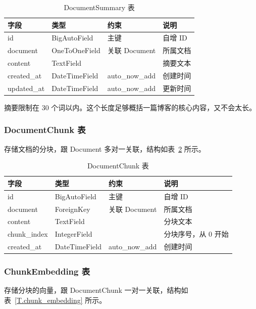 \begin{table}[htb]
  \centering
  \caption{DocumentSummary 表}
  \label{T.document_summary}
  \begin{tabular}{llll}
    \hline
    字段 & 类型 & 约束 & 说明 \\
    \hline
    id & BigAutoField & 主键 & 自增 ID \\
    document & OneToOneField & 关联 Document & 所属文档 \\
    content & TextField & & 摘要文本 \\
    created\_at & DateTimeField & auto\_now\_add & 创建时间 \\
    updated\_at & DateTimeField & auto\_now\_add & 更新时间 \\
    \hline
  \end{tabular}
\end{table}

摘要限制在 30 个词以内。这个长度足够概括一篇博客的核心内容，又不会太长。

\subsubsection{DocumentChunk 表}

存储文档的分块，跟 Document 多对一关联，结构如表~\ref{T.document_chunk} 所示。

\begin{table}[htb]
  \centering
  \caption{DocumentChunk 表}
  \label{T.document_chunk}
  \begin{tabular}{llll}
    \hline
    字段 & 类型 & 约束 & 说明 \\
    \hline
    id & BigAutoField & 主键 & 自增 ID \\
    document & ForeignKey & 关联 Document & 所属文档 \\
    content & TextField & & 分块文本 \\
    chunk\_index & IntegerField & & 分块序号，从 0 开始 \\
    created\_at & DateTimeField & auto\_now\_add & 创建时间 \\
    \hline
  \end{tabular}
\end{table}

\subsubsection{ChunkEmbedding 表}

存储分块的向量，跟 DocumentChunk 一对一关联，结构如表~\ref{T.chunk_embedding} 所示。

